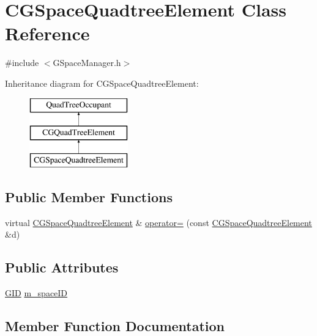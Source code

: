 \hypertarget{class_c_g_space_quadtree_element}{}\section{C\+G\+Space\+Quadtree\+Element Class Reference}
\label{class_c_g_space_quadtree_element}


{\ttfamily \#include $<$G\+Space\+Manager.\+h$>$}

Inheritance diagram for C\+G\+Space\+Quadtree\+Element\+:\begin{figure}[H]
\begin{center}
\leavevmode
\includegraphics[height=3.000000cm]{class_c_g_space_quadtree_element}
\end{center}
\end{figure}
\subsection*{Public Member Functions}
\begin{DoxyCompactItemize}
\item 
virtual \hyperlink{class_c_g_space_quadtree_element}{C\+G\+Space\+Quadtree\+Element} \& \hyperlink{class_c_g_space_quadtree_element_ac1226ecfe0572ad4b416d596fc4a5c1c}{operator=} (const \hyperlink{class_c_g_space_quadtree_element}{C\+G\+Space\+Quadtree\+Element} \&d)
\end{DoxyCompactItemize}
\subsection*{Public Attributes}
\begin{DoxyCompactItemize}
\item 
\hyperlink{_g_types_8h_a5b96ecb16d8e437977d12cd40aa6f6d8}{G\+I\+D} \hyperlink{class_c_g_space_quadtree_element_a1bb778a5aa940224c5cbc84bf2911eb5}{m\+\_\+space\+I\+D}
\end{DoxyCompactItemize}


\subsection{Member Function Documentation}
\hypertarget{class_c_g_space_quadtree_element_ac1226ecfe0572ad4b416d596fc4a5c1c}{}
